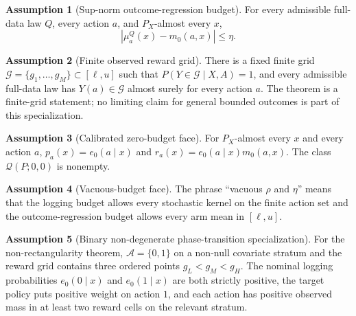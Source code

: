 \documentclass[11pt]{article}
\theoremstyle{definition}
\newtheorem{assumption}{Assumption}
\theoremstyle{plain}
\theoremstyle{remark}
\begin{document}
\begin{assumption}[Sup-norm outcome-regression budget]\label{ass:outcome-gap}
For every admissible full-data law $Q$, every action $a$, and $P_X$-almost
every $x$,
\[
  |\mu_a^Q(x)-m_0(a,x)|\le \eta.
\]
\end{assumption}

\begin{assumption}[Finite observed reward grid]\label{ass:finite-support}
There is a fixed finite grid $\mathcal G=\{g_1,\ldots,g_M\}\subset[\ell,u]$
such that $P(Y\in\mathcal G\mid X,A)=1$, and every admissible full-data law has
$Y(a)\in\mathcal G$ almost surely for every action $a$.  The theorem is a
finite-grid statement; no limiting claim for general bounded outcomes is part
of this specialization.
\end{assumption}

\begin{assumption}[Calibrated zero-budget face]\label{ass:zero-calibrated}
For $P_X$-almost every $x$ and every action $a$,
$p_a(x)=e_0(a\mid x)$ and $r_a(x)=e_0(a\mid x)m_0(a,x)$.  The class
$\mathcal Q(P;0,0)$ is nonempty.
\end{assumption}

\begin{assumption}[Vacuous-budget face]\label{ass:vacuous}
The phrase ``vacuous $\rho$ and $\eta$'' means that the logging budget allows
every stochastic kernel on the finite action set and the outcome-regression
budget allows every arm mean in $[\ell,u]$.
\end{assumption}

\begin{assumption}[Binary non-degenerate phase-transition specialization]\label{ass:binary-nondegenerate}
For the non-rectangularity theorem, $\mathcal A=\{0,1\}$ on a non-null
covariate stratum and the reward grid contains three ordered points
$g_L<g_M<g_H$.  The nominal logging probabilities
$e_0(0\mid x)$ and $e_0(1\mid x)$ are both strictly positive, the target policy
puts positive weight on action $1$, and each action has positive observed mass
in at least two reward cells on the relevant stratum.
\end{assumption}
\end{document}
